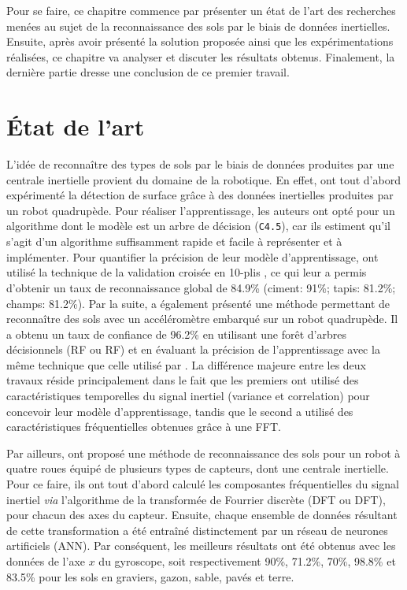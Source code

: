 Pour se faire, ce chapitre commence par présenter un état de l'art des recherches menées au sujet de la reconnaissance des sols par le biais de données inertielles. Ensuite, après avoir présenté la solution proposée ainsi que les expérimentations réalisées, ce chapitre va analyser et discuter les résultats obtenus. Finalement, la dernière partie dresse une conclusion de ce premier travail.

\section{État de l'art}
\label{sec:t1-related-work}

L'idée de reconnaître des types de sols par le biais de données produites par une centrale inertielle provient du domaine de la robotique. En effet, \cite{Vail2004} ont tout d'abord expérimenté la détection de surface grâce à des données inertielles produites par un robot quadrupède. Pour réaliser l'apprentissage, les auteurs ont opté pour un algorithme dont le modèle est un arbre de décision (\texttt{C4.5}), car ils estiment qu'il s'agit d'un algorithme suffisamment rapide et facile à représenter et à implémenter. Pour quantifier la précision de leur modèle d'apprentissage, \citeauthor{Vail2004} ont utilisé la technique de la validation croisée en 10-plis \citep{Kohavi1995}, ce qui leur a permis d'obtenir un taux de reconnaissance global de 84.9\% (ciment: 91\%; tapis: 81.2\%; champs: 81.2\%). Par la suite, \cite{Kertesz2016} a également présenté une méthode permettant de reconnaître des sols avec un accéléromètre embarqué sur un robot quadrupède. Il a obtenu un taux de confiance de 96.2\% en utilisant une forêt d’arbres décisionnels (\acl{RF} ou \acs{RF}) et en évaluant la précision de l'apprentissage avec la même technique que celle utilisé par \citeauthor{Vail2004}. La différence majeure entre les deux travaux réside principalement dans le fait que les premiers ont utilisé des caractéristiques temporelles du signal inertiel (variance et correlation) pour concevoir leur modèle d'apprentissage, tandis que le second a utilisé des caractéristiques fréquentielles obtenues grâce à une \acs{FFT}.

Par ailleurs, \cite{Bibuli2007} ont proposé une méthode de reconnaissance des sols pour un robot à quatre roues équipé de plusieurs types de capteurs, dont une centrale inertielle. Pour ce faire, ils ont tout d'abord calculé les composantes fréquentielles du signal inertiel \textit{via} l'algorithme de la transformée de Fourrier discrète (\acl{DFT} ou \acs{DFT}), pour chacun des axes du capteur. Ensuite, chaque ensemble de données résultant de cette transformation a été entraîné distinctement par un réseau de neurones artificiels (\acs{ANN}). Par conséquent, les meilleurs résultats ont été obtenus avec les données de l'axe $x$ du gyroscope, soit respectivement 90\%, 71.2\%, 70\%, 98.8\% et 83.5\% pour les sols en graviers, gazon, sable, pavés et terre.

